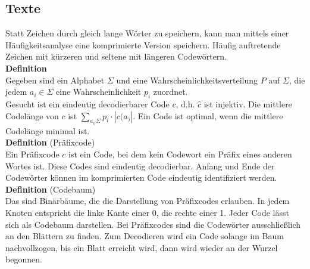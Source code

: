 \documentclass[a4paper, 12pt]{article}
\begin{document}
	\subsection{Texte}
	Statt Zeichen durch gleich lange Wörter zu speichern, kann man mittels einer Häufigkeitsanalyse eine komprimierte Version speichern. Häufig auftretende Zeichen mit kürzeren und seltene mit längeren Codewörtern.\\
	\textbf{Definition}\\
	Gegeben sind ein Alphabet $\Sigma$ und eine Wahrscheinlichkeitsverteilung $P$ auf $\Sigma$, die jedem $a_i \in \Sigma$ eine Wahrscheinlichkeit $p_i$ zuordnet. \\
	Gesucht ist ein eindeutig decodierbarer Code $c$, d.h. $\hat{c}$ ist injektiv. Die mittlere Codelänge von $c$ ist $\sum_{a_ \in \Sigma} p_i \cdot \left|c(a_)\right|$. Ein Code ist optimal, wenn die mittlere Codelänge minimal ist.\\
	\textbf{Definition} (Präfixcode)\\
	Ein Präfixcode $c$ ist ein Code, bei dem kein Codewort ein Präfix eines anderen Wortes ist. Diese Codes sind eindeutig decodierbar. Anfang und Ende der Codewörter können im komprimierten Code eindeutig identifiziert werden.\\
	\textbf{Definition} (Codebaum)\\
	Das sind Binärbäume, die die Darstellung von Präfixcodes erlauben. In jedem Knoten entspricht die linke Kante einer 0, die rechte einer 1. Jeder Code lässt sich als Codebaum darstellen. Bei Präfixcodes sind die Codewörter ausschließlich an den Blättern zu finden. Zum Decodieren wird ein Code solange im Baum nachvollzogen, bis ein Blatt erreicht wird, dann wird wieder an der Wurzel begonnen.
\end{document}
